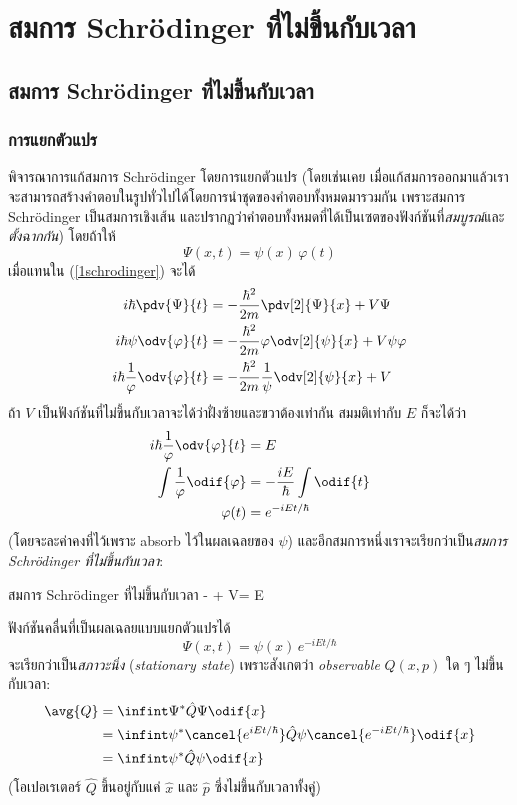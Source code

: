 \chapter{สมการ Schrödinger ที่ไม่ขึ้นกับเวลา}

\section{สมการ Schrödinger ที่ไม่ขึ้นกับเวลา}

\subsection{การแยกตัวแปร}

พิจารณาการแก้สมการ Schrödinger โดยการแยกตัวแปร (โดยเช่นเคย เมื่อแก้สมการออกมาแล้วเราจะสามารถสร้างคำตอบในรูปทั่วไปได้โดยการนำชุดของคำตอบทั้งหมดมารวมกัน เพราะสมการ Schrödinger เป็นสมการเชิงเส้น และปรากฏว่าคำตอบทั้งหมดที่ได้เป็นเซตของฟังก์ชันที่\emph{สมบูรณ์}และ\emph{ตั้งฉากกัน}) โดยถ้าให้
\[
\Psi(x, t) = \psi(x)\,\varphi(t)
\]
เมื่อแทนใน (\ref{1schrodinger}) จะได้
\begin{align*}
    i\hbar\pdv{\Psi}{t} &= -\frac{\hbar^2}{2m} \pdv[2]{\Psi}{x} + V\Psi\\
    i\hbar\psi\odv{\varphi}{t} &= -\frac{\hbar^2}{2m}\varphi\odv[2]{\psi}{x} + V\psi\varphi\\
    i\hbar\frac{1}{\varphi}\odv{\varphi}{t} &= -\frac{\hbar^2}{2m}\frac{1}{\psi}\odv[2]{\psi}{x} + V
\end{align*}
ถ้า $V$ เป็นฟังก์ชันที่ไม่ขึ้นกับเวลาจะได้ว่าฝั่งซ้ายและขวาต้องเท่ากัน สมมติเท่ากับ $E$ ก็จะได้ว่า
\begin{align}
    i\hbar\frac{1}{\varphi}\odv{\varphi}{t} &= E\notag\\
    \int\frac{1}{\varphi}\odif{\varphi} &= -\frac{iE}{\hbar}\int\odif{t}\notag\\
    \varphi(t) &= e^{-iEt/\hbar}
\end{align}
(โดยจะละค่าคงที่ไว้เพราะ absorb ไว้ในผลเฉลยของ $\psi$) และอีกสมการหนึ่งเราจะเรียกว่าเป็น\emph{สมการ Schrödinger ที่ไม่ขึ้นกับเวลา}: 
\begin{ieqbox}{สมการ Schrödinger ที่ไม่ขึ้นกับเวลา}
    - + V\psi = E\psi\label{2timeindepschrodinger}
\end{ieqbox}

ฟังก์ชันคลื่นที่เป็นผลเฉลยแบบแยกตัวแปรได้
\begin{equation}
    \Psi(x, t) = \psi(x)\,e^{-iEt/\hbar}
\end{equation}
จะเรียกว่าเป็น\emph{สภาวะนิ่ง} (\emph{stationary state}) เพราะสังเกตว่า \emph{observable} $Q(x, p)$ ใด ๆ ไม่ขึ้นกับเวลา:
\begin{align*}
    \avg{Q} &= \infint \Psi^*\hat{Q}\Psi \odif{x}\\
    &= \infint \psi^*\cancel{e^{iEt/\hbar}}\hat{Q}\psi \cancel{e^{-iEt/\hbar}} \odif{x}\\
    &= \infint \psi^*\hat{Q}\psi \odif{x}
\end{align*}
(โอเปอเรเตอร์ $\hat{Q}$ ขึ้นอยู่กับแค่ $\hat{x}$ และ $\hat{p}$ ซึ่งไม่ขึ้นกับเวลาทั้งคู่)

